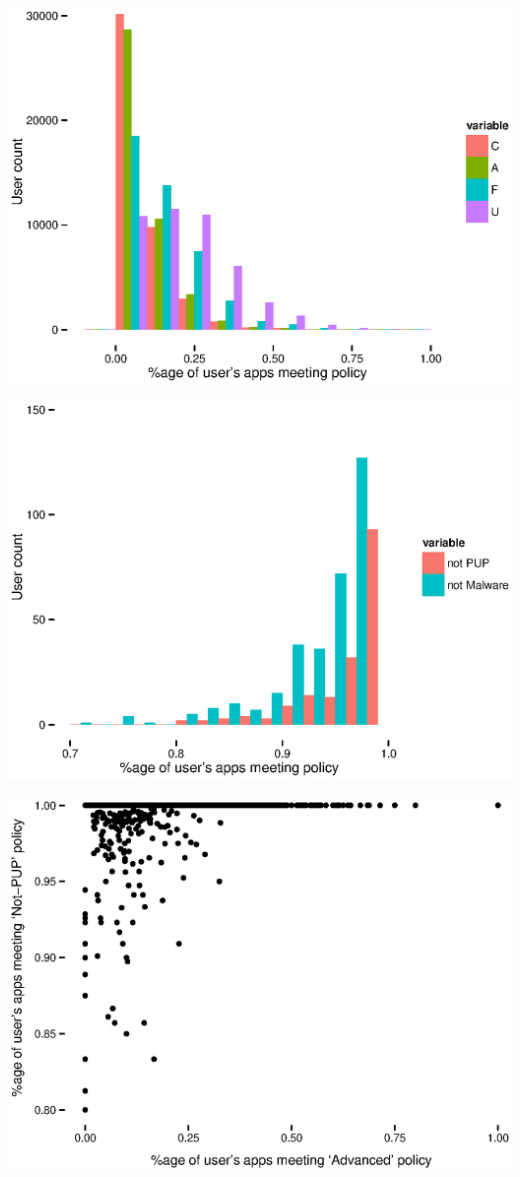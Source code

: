 \documentclass{beamer}
\begin{document}
\begin{frame}
  \includegraphics[width=\linewidth]{presentation/lin.eps}
\end{frame}
\begin{frame}
  \includegraphics[width=\linewidth]{presentation/malware.eps}
\end{frame}
\begin{frame}
  \includegraphics[width=\linewidth]{presentation/advanced-v-pup.eps}
\end{frame}
\end{document}
